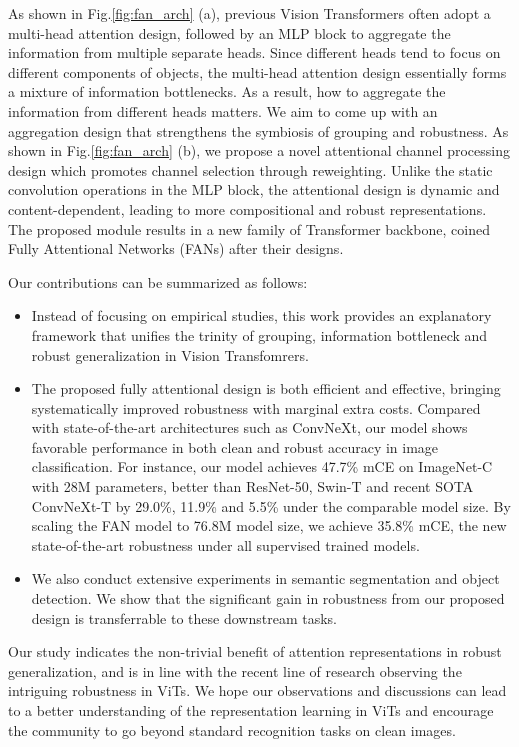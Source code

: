 \documentclass[nohyperref]{article}
\theoremstyle{plain}
\theoremstyle{definition}
\theoremstyle{remark}
\begin{document}
As shown in Fig.\ref{fig:fan_arch} (a), previous Vision Transformers often adopt a multi-head attention design, followed by an MLP block to aggregate the information from multiple separate heads. Since different heads tend to focus on different components of objects, the multi-head attention design essentially forms a mixture of information bottlenecks. As a result, how to aggregate the information from different heads matters. We aim to come up with an aggregation design that strengthens the symbiosis of grouping and robustness. As shown in Fig.\ref{fig:fan_arch} (b), we propose a novel attentional channel processing design which promotes channel selection through reweighting. Unlike the static convolution operations in the MLP block, the attentional design is dynamic and content-dependent, leading to more compositional and robust representations. The proposed module results in a new family of Transformer backbone, coined Fully Attentional Networks (FANs) after their designs.

Our contributions can be summarized as follows:
\begin{itemize}[leftmargin=1.3em,topsep=1pt,itemsep=0.1pt]
\item Instead of focusing on empirical studies, this work provides an explanatory framework that unifies the trinity of grouping, information bottleneck and robust generalization in Vision Transfomrers.
\item The proposed fully attentional design is both efficient and effective, bringing systematically improved robustness with marginal extra costs. Compared with state-of-the-art architectures such as ConvNeXt, our model shows favorable performance in both clean and robust accuracy in image classification. For instance, our model achieves 47.7\% mCE on ImageNet-C with 28M parameters, better than ResNet-50, Swin-T and recent SOTA ConvNeXt-T by 29.0\%, 11.9\% and 5.5\% under the comparable model size. By scaling the FAN model to 76.8M model size, we achieve 35.8\% mCE, the new state-of-the-art robustness under all supervised trained models. 
\item We also conduct extensive experiments in semantic segmentation and object detection. We show that the significant gain in robustness from our proposed design is transferrable to these downstream tasks.
\end{itemize}

Our study indicates the non-trivial benefit of attention representations in robust generalization, and is in line with the recent line of research observing the intriguing robustness in ViTs. We hope our observations and discussions can lead to a better understanding of the representation learning in ViTs and encourage the community to go beyond standard recognition tasks on clean images.
\end{document}
